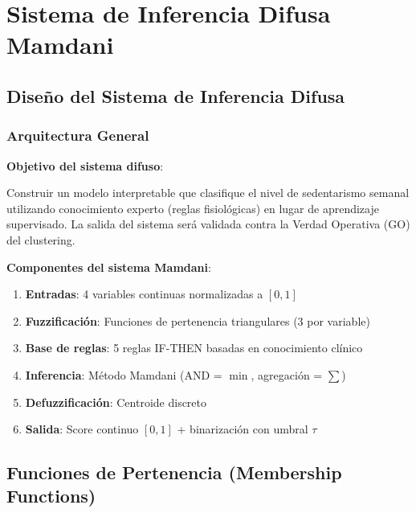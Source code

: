 \documentclass[12pt,letterpaper,twoside]{report}
\begin{document}
\chapter{Sistema de Inferencia Difusa Mamdani}

\section{Diseño del Sistema de Inferencia Difusa}

\subsection{Arquitectura General}

\begin{hipotesisbox}
\textbf{Objetivo del sistema difuso}:

Construir un modelo interpretable que clasifique el nivel de sedentarismo semanal utilizando conocimiento experto (reglas fisiológicas) en lugar de aprendizaje supervisado. La salida del sistema será validada contra la Verdad Operativa (GO) del clustering.
\end{hipotesisbox}

\begin{estadisticobox}
\textbf{Componentes del sistema Mamdani}:

\begin{enumerate}[noitemsep]
    \item \textbf{Entradas}: 4 variables continuas normalizadas a $[0,1]$
    \item \textbf{Fuzzificación}: Funciones de pertenencia triangulares (3 por variable)
    \item \textbf{Base de reglas}: 5 reglas IF-THEN basadas en conocimiento clínico
    \item \textbf{Inferencia}: Método Mamdani (AND = $\min$, agregación = $\sum$)
    \item \textbf{Defuzzificación}: Centroide discreto
    \item \textbf{Salida}: Score continuo $[0,1]$ + binarización con umbral $\tau$
\end{enumerate}
\end{estadisticobox}

\section{Funciones de Pertenencia (Membership Functions)}
\end{document}

